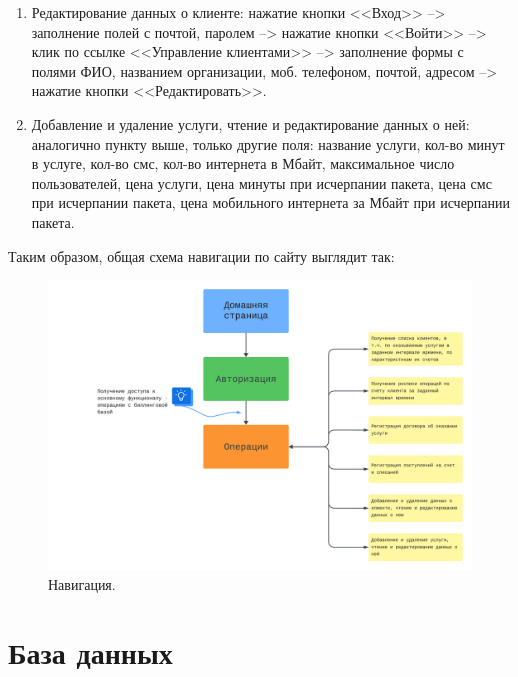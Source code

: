 \documentclass[oneside,senior,etd]{BYUPhysForDegree}
\begin{document}
\begin{enumerate}
    \item Редактирование данных о клиенте:
    нажатие кнопки <<Вход>> --> заполнение полей с почтой, паролем --> нажатие кнопки <<Войти>> --> клик по ссылке <<Управление клиентами>> --> заполнение формы с полями ФИО, названием организации, моб. телефоном, почтой, адресом --> нажатие кнопки <<Редактировать>>.

    \item Добавление и удаление услуги, чтение и редактирование данных о ней:
    аналогично пункту выше, только другие поля: название услуги, кол-во минут в услуге, кол-во смс, кол-во интернета в Мбайт, максимальное число пользователей, цена услуги, цена минуты при исчерпании пакета, цена смс при исчерпании пакета, цена мобильного интернета за Мбайт при исчерпании пакета.

\end{enumerate}

\newpage
Таким образом, общая схема навигации по сайту выглядит так:

\begin{figure}[hbt!]
    \centering
    \includegraphics[width=1.0\linewidth]{sitemap.png}
    \caption{Навигация.}
    \label{fig:sitemap}
\end{figure}

\newpage
\section{База данных}
\end{document}
